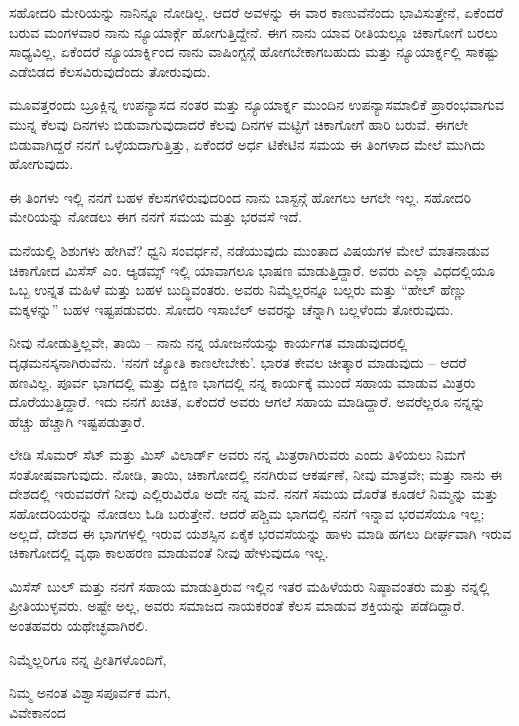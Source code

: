 ಸಹೋದರಿ ಮೇರಿಯನ್ನು ನಾನಿನ್ನೂ ನೋಡಿಲ್ಲ. ಆದರೆ ಅವಳನ್ನು ಈ ವಾರ ಕಾಣುವೆನೆಂದು ಭಾವಿಸುತ್ತೇನೆ, ಏಕೆಂದರೆ ಬರುವ ಮಂಗಳವಾರ ನಾನು ನ್ಯೂಯಾರ್ಕ್ಗೆ ಹೋಗುತ್ತಿದ್ದೇನೆ. ಈಗ ನಾನು ಯಾವ ರೀತಿಯಲ್ಲೂ ಚಿಕಾಗೋಗೆ ಬರಲು ಸಾಧ್ಯವಿಲ್ಲ, ಏಕೆಂದರೆ ನ್ಯೂಯಾರ್ಕ್ನಿಂದ ನಾನು ವಾಷಿಂಗ್ಟನ್ಗೆ ಹೋಗಬೇಕಾಗಬಹುದು ಮತ್ತು ನ್ಯೂಯಾರ್ಕ್ನಲ್ಲಿ ಸಾಕಷ್ಟು ಎಡೆಬಿಡದ ಕೆಲಸವಿರುವುದೆಂದು ತೋರುವುದು.

ಮೂವತ್ತರಂದು ಬ್ರೂಕ್ಲಿನ್ನ ಉಪನ್ಯಾಸದ ನಂತರ ಮತ್ತು ನ್ಯೂಯಾರ್ಕ್ನ ಮುಂದಿನ ಉಪನ್ಯಾಸಮಾಲಿಕೆ ಪ್ರಾರಂಭವಾಗುವ ಮುನ್ನ ಕೆಲವು ದಿನಗಳು ಬಿಡುವಾಗುವುದಾದರೆ ಕೆಲವು ದಿನಗಳ ಮಟ್ಟಿಗೆ ಚಿಕಾಗೋಗೆ ಹಾರಿ ಬರುವೆ. ಈಗಲೇ ಬಿಡುವಾಗಿದ್ದರೆ ನನಗೆ ಒಳ್ಳೆಯದಾಗುತ್ತಿತ್ತು, ಏಕೆಂದರೆ ಅರ್ಧ ಟಿಕೇಟಿನ ಸಮಯ ಈ ತಿಂಗಳಾದ ಮೇಲೆ ಮುಗಿದು ಹೋಗುವುದು.

ಈ ತಿಂಗಳು ಇಲ್ಲಿ ನನಗೆ ಬಹಳ ಕೆಲಸಗಳಿರುವುದರಿಂದ ನಾನು ಬಾಸ್ಟನ್ಗೆ ಹೋಗಲು ಆಗಲೇ ಇಲ್ಲ. ಸಹೋದರಿ ಮೇರಿಯನ್ನು ನೋಡಲು ಈಗ ನನಗೆ ಸಮಯ ಮತ್ತು ಭರವಸೆ ಇದೆ.

ಮನೆಯಲ್ಲಿ ಶಿಶುಗಳು ಹೇಗಿವೆ? ಧ್ವನಿ ಸಂವರ್ಧನೆ, ನಡೆಯುವುದು ಮುಂತಾದ ವಿಷಯಗಳ ಮೇಲೆ ಮಾತನಾಡುವ ಚಿಕಾಗೋದ ಮಿಸೆಸ್ ಎಂ. ಆ್ಯಡಮ್ಸ್ ಇಲ್ಲಿ ಯಾವಾಗಲೂ ಭಾಷಣ ಮಾಡುತ್ತಿದ್ದಾರೆ. ಅವರು ಎಲ್ಲಾ ವಿಧದಲ್ಲಿಯೂ ಒಬ್ಬ ಉನ್ನತ ಮಹಿಳೆ ಮತ್ತು ಬಹಳ ಬುದ್ಧಿವಂತರು. ಅವರು ನಿಮ್ಮೆಲ್ಲರನ್ನೂ ಬಲ್ಲರು ಮತ್ತು “ಹೇಲ್ ಹೆಣ್ಣು ಮಕ್ಕಳನ್ನು” ಬಹಳ ಇಷ್ಟಪಡುವರು. ಸೋದರಿ ಇಸಾಬೆಲ್ ಅವರನ್ನು ಚೆನ್ನಾಗಿ ಬಲ್ಲಳೆಂದು ತೋರುವುದು.

ನೀವು ನೋಡುತ್ತಿಲ್ಲವೇ, ತಾಯಿ – ನಾನು ನನ್ನ ಯೋಜನೆಯನ್ನು ಕಾರ್ಯಗತ ಮಾಡುವುದರಲ್ಲಿ ದೃಢಮನಸ್ಕನಾಗಿರುವೆನು. ‘ನನಗೆ ಜ್ಯೋತಿ ಕಾಣಲೇಬೇಕು’. ಭಾರತ ಕೇವಲ ಚೀತ್ಕಾರ ಮಾಡುವುದು – ಆದರೆ ಹಣವಿಲ್ಲ. ಪೂರ್ವ ಭಾಗದಲ್ಲಿ ಮತ್ತು ದಕ್ಷಿಣ ಭಾಗದಲ್ಲಿ ನನ್ನ ಕಾರ್ಯಕ್ಕೆ ಮುಂದೆ ಸಹಾಯ ಮಾಡುವ ಮಿತ್ರರು ದೊರೆಯುತ್ತಿದ್ದಾರೆ. ಇದು ನನಗೆ ಖಚಿತ, ಏಕೆಂದರೆ ಅವರು ಆಗಲೆ ಸಹಾಯ ಮಾಡಿದ್ದಾರೆ. ಅವರೆಲ್ಲರೂ ನನ್ನನ್ನು ಹೆಚ್ಚು ಹೆಚ್ಚಾಗಿ ಇಷ್ಟಪಡುತ್ತಾರೆ.

ಲೇಡಿ ಸೊಮರ್ ಸೆಟ್ ಮತ್ತು ಮಿಸ್ ವಿಲಾರ್ಡ್ ಅವರು ನನ್ನ ಮಿತ್ರರಾಗಿರುವರು ಎಂದು ತಿಳಿಯಲು ನಿಮಗೆ ಸಂತೋಷವಾಗುವುದು. ನೋಡಿ, ತಾಯಿ, ಚಿಕಾಗೋದಲ್ಲಿ ನನಗಿರುವ ಆಕರ್ಷಣೆ, ನೀವು ಮಾತ್ರವೇ; ಮತ್ತು ನಾನು ಈ ದೇಶದಲ್ಲಿ ಇರುವವರೆಗೆ ನೀವು ಎಲ್ಲಿರುವಿರೊ ಅದೇ ನನ್ನ ಮನೆ. ನನಗೆ ಸಮಯ ದೊರೆತ ಕೂಡಲೆ ನಿಮ್ಮನ್ನು ಮತ್ತು ಸಹೋದರಿಯರನ್ನು ನೋಡಲು ಓಡಿ ಬರುತ್ತೇನೆ. ಆದರೆ ಪಶ್ಚಿಮ ಭಾಗದಲ್ಲಿ ನನಗೆ ಇನ್ನಾವ ಭರವಸೆಯೂ ಇಲ್ಲ; ಅಲ್ಲದೆ, ದೇಶದ ಈ ಭಾಗಗಳಲ್ಲಿ ಇರುವ ಯಶಸ್ಸಿನ ಏಕೈಕ ಭರವಸೆಯನ್ನು ಹಾಳು ಮಾಡಿ ಹಗಲು ದೀರ್ಘವಾಗಿ ಇರುವ ಚಿಕಾಗೋದಲ್ಲಿ ವೃಥಾ ಕಾಲಹರಣ ಮಾಡುವಂತೆ ನೀವು ಹೇಳುವುದೂ ಇಲ್ಲ.

ಮಿಸೆಸ್ ಬುಲ್ ಮತ್ತು ನನಗೆ ಸಹಾಯ ಮಾಡುತ್ತಿರುವ ಇಲ್ಲಿನ ಇತರ ಮಹಿಳೆಯರು ನಿಷ್ಠಾವಂತರು ಮತ್ತು ನನ್ನಲ್ಲಿ ಪ್ರೀತಿಯುಳ್ಳವರು. ಅಷ್ಟೇ ಅಲ್ಲ, ಅವರು ಸಮಾಜದ ನಾಯಕರಂತೆ ಕೆಲಸ ಮಾಡುವ ಶಕ್ತಿಯನ್ನು ಪಡೆದಿದ್ದಾರೆ. ಅಂತಹವರು ಯಥೇಚ್ಛವಾಗಿರಲಿ.

ನಿಮ್ಮೆಲ್ಲರಿಗೂ ನನ್ನ ಪ್ರೀತಿಗಳೊಂದಿಗೆ,

\begin{flushright}
ನಿಮ್ಮ ಅನಂತ ವಿಶ್ವಾಸಪೂರ್ವಕ ಮಗ,\\ವಿವೇಕಾನಂದ
\end{flushright}

